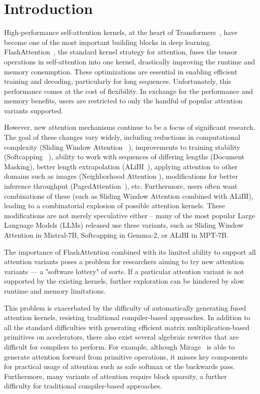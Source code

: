 \section{Introduction}

High-performance self-attention kernels, at the heart of Transformers~\cite{transformer}, have become one of the most important building blocks in deep learning. FlashAttention~\cite{flashattention, flashattention2}, the standard kernel strategy for attention, fuses the tensor operations in self-attention into one kernel, drastically improving the runtime and memory consumption. These optimizations are essential in enabling efficient training and decoding, particularly for long sequences. 
Unfortunately, this performance comes at the cost of flexibility. In exchange for the performance and memory benefits, users are restricted to only the handful of popular attention variants supported. 

However, new attention mechanisms continue to be a focus of significant research. The goal of these changes vary widely, including reductions in computational complexity (Sliding Window Attention ~\cite{slidingwindow}), improvements to training stability (Softcapping ~\cite{gemma2}), ability to work with sequences of differing lengths (Document Masking), better length extrapolation (ALiBI~\cite{alibi}), applying attention to other domains such as images (Neighborhood Attention \cite{NAdeliated}), modifications for better inference throughput (PagedAttention~\cite{PagedAttn}), etc. Furthermore, users often want combinations of these (such as Sliding Window Attention combined with ALiBI), leading to a combinatorial explosion of possible attention kernels. These modifications are not merely speculative either -- many of the most popular Large Language Models (LLMs) released use these variants, such as Sliding Window Attention in Mistral-7B, Softcapping in Gemma-2, or ALiBI in MPT-7B.

The importance of FlashAttention combined with its limited ability to support all attention variants poses a problem for researchers aiming to try new attention variants — a "software lottery" of sorts. If a particular attention variant is not supported by the existing kernels, further exploration can be hindered by slow runtime and memory limitations.


This problem is exacerbated by the difficulty of automatically generating fused attention kernels, resisting traditional compiler-based approaches. In addition to all the standard difficulties with generating efficient matrix multiplication-based primitives on accelerators, there also exist several algebraic rewrites that are difficult for compilers to perform. For example, although Mirage~\cite{mirage} is able to generate attention forward from primitive operations, it misses key components for practical usage of attention such as safe softmax or the backwards pass. Furthermore, many variants of attention require block sparsity, a further difficulty for traditional compiler-based approaches.

